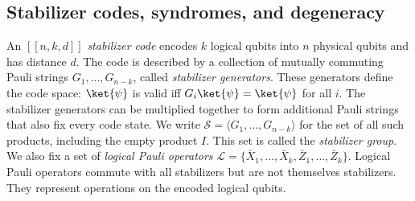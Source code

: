 \documentclass[acmsmall,screen,review,anonymous,nonacm]{acmart}
\newcommand{\cy}[1]{}
\begin{document}



\subsection{Stabilizer codes, syndromes, and degeneracy}

An $[[n,k,d]]$ \emph{stabilizer code} encodes $k$ logical qubits into $n$ physical qubits and has distance $d$. The code is described by a collection of mutually commuting Pauli strings $G_1,\ldots,G_{n-k}$,
called \emph{stabilizer generators}. These generators define the code space: $\ket{\psi}$ is valid iff $G_i\ket{\psi}=\ket{\psi}$ for all $i$. The stabilizer generators can be multiplied together to form additional Pauli strings that also fix every code state. We write
$\mathcal{S}=\langle G_1,\ldots,G_{n-k}\rangle$
for the set of all such products, including the empty product $I$. This set is called the \emph{stabilizer group}.
We also fix a set of \emph{logical Pauli operators}
$\mathcal{L}
=
\{\bar X_1,\ldots,\bar X_k,\bar Z_1,\ldots,\bar Z_k\}$.
Logical Pauli operators commute with all stabilizers but are not themselves stabilizers. They represent operations on the encoded logical qubits.
\end{document}
